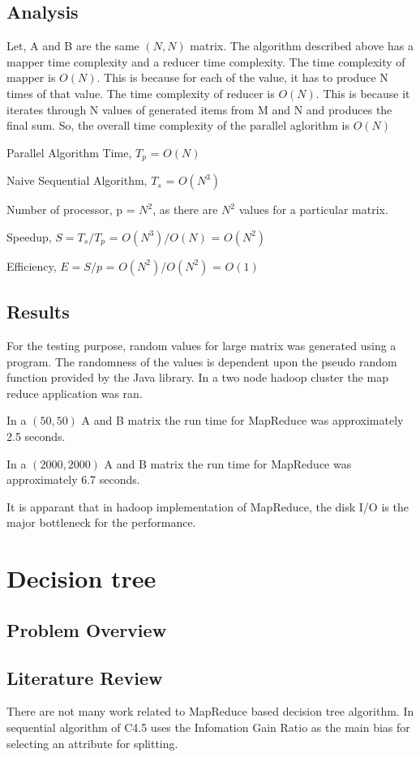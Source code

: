 \documentclass{article}
\begin{document}
\subsection{Analysis}
Let, A and B are the same $(N,N)$ matrix.
The algorithm described above has a mapper time complexity and a reducer time complexity.
The time complexity of mapper is ${O(N)}$. This is because for each of the value, it has to produce N times of that value.
The time complexity of reducer is ${O(N)}$. This is because it iterates through N values of generated items from M and N and produces the final sum.
So, the overall time complexity of the parallel aglorithm is ${O(N)}$\BlankLine

Parallel Algorithm Time, ${T_{p}}$ = ${O(N)}$

Naive Sequential Algorithm, ${T_{s}}$ = ${O(N^3)}$

Number of processor, p = ${N^2}$, as there are ${N^2}$ values for a particular matrix.

Speedup, ${S = T_{s}/T_{p}}$ = ${O(N^3)/O(N)}$ = ${O(N^2)}$

Efficiency, ${E = S/p}$ = ${O(N^2) / O(N^2)}$ = ${O(1)}$

\subsection{Results}
For the testing purpose, random values for large matrix was generated using a program. The randomness of the values is dependent upon the pseudo random function provided by the Java library. In a two node hadoop cluster the map reduce application was ran.\BlankLine

In a $(50,50)$ A and B matrix the run time for MapReduce was approximately 2.5 seconds.

In a $(2000,2000)$ A and B matrix the run time for MapReduce was approximately 6.7 seconds.

It is apparant that in hadoop implementation of MapReduce, the disk I/O is the major bottleneck for the performance.

\section{Decision tree}

\subsection{Problem Overview}
\subsection{Literature Review}
There are not many work related to MapReduce based decision tree algorithm.
\BlankLine In sequential algorithm of C4.5 uses the Infomation Gain Ratio as the main bias for selecting an attribute for splitting.
\end{document}
